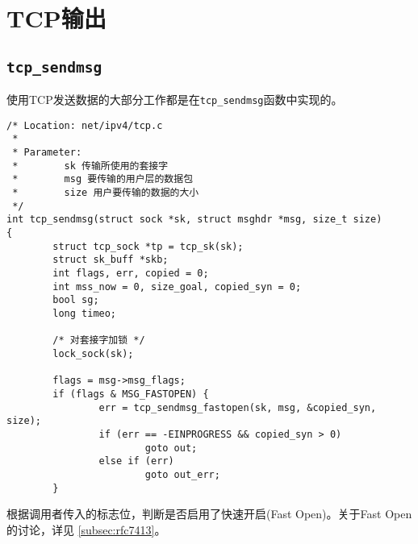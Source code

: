 \chapter{TCP输出}
\label{chapter:tcp_output}

\minitoc

\section{\texttt{tcp_sendmsg}}
使用TCP发送数据的大部分工作都是在\texttt{tcp_sendmsg}函数中实现的。

\begin{verbatim}
/* Location: net/ipv4/tcp.c
 *
 * Parameter:
 *        sk 传输所使用的套接字
 *        msg 要传输的用户层的数据包
 *        size 用户要传输的数据的大小
 */
int tcp_sendmsg(struct sock *sk, struct msghdr *msg, size_t size)
{
        struct tcp_sock *tp = tcp_sk(sk);
        struct sk_buff *skb;
        int flags, err, copied = 0;
        int mss_now = 0, size_goal, copied_syn = 0;
        bool sg;
        long timeo;

        /* 对套接字加锁 */
        lock_sock(sk);

        flags = msg->msg_flags;
        if (flags & MSG_FASTOPEN) {
                err = tcp_sendmsg_fastopen(sk, msg, &copied_syn, size);
                if (err == -EINPROGRESS && copied_syn > 0)
                        goto out;
                else if (err)
                        goto out_err;
        }
\end{verbatim}
根据调用者传入的标志位，判断是否启用了快速开启(Fast Open)。关于Fast Open的讨论，详见
\ref{subsec:rfc7413}。

